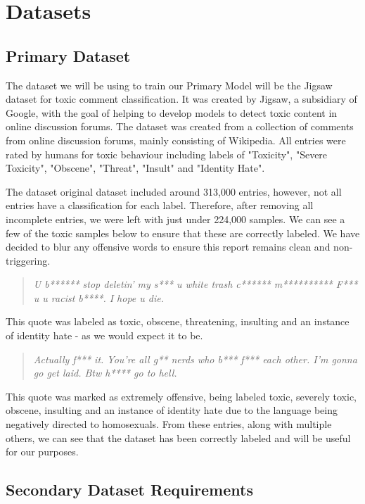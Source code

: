 \chapter{Datasets}

\section{Primary Dataset}
\label{sec:JigsawDataset}

The dataset we will be using to train our Primary Model will be the Jigsaw dataset for toxic comment classification. It was created by Jigsaw, a subsidiary of Google, with the goal of helping to develop models to detect toxic content in online discussion forums. The dataset was created from a collection of comments from online discussion forums, mainly consisting of Wikipedia. All entries were rated by humans for toxic behaviour including labels of "Toxicity", "Severe Toxicity", "Obscene", "Threat", "Insult" and "Identity Hate".

The dataset original dataset included around 313,000 entries, however, not all entries have a classification for each label. Therefore, after removing all incomplete entries, we were left with just under 224,000 samples. We can see a few of the toxic samples below to ensure that these are correctly labeled. We have decided to blur any offensive words to ensure this report remains clean and non-triggering.

\begin{quote}
    \textit{U b****** stop deletin' my s*** u white trash c****** m********** F*** u u racist b****. I hope u die.}
\end{quote}

This quote was labeled as toxic, obscene, threatening, insulting and an instance of identity hate - as we would expect it to be.

\begin{quote}
    \textit{Actually f*** it. You're all g** nerds who b*** f*** each other. I'm gonna go get laid. Btw h**** go to hell.}
\end{quote}

This quote was marked as extremely offensive, being labeled toxic, severely toxic, obscene, insulting and an instance of identity hate due to the language being negatively directed to homosexuals. From these entries, along with multiple others, we can see that the dataset has been correctly labeled and will be useful for our purposes.

\section{Secondary Dataset Requirements}


